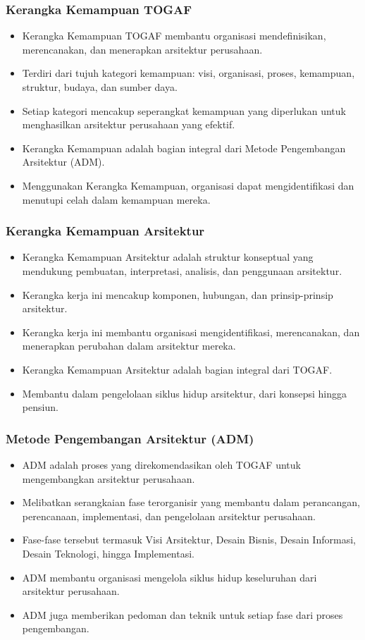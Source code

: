 \documentclass{beamer}
\begin{document}
	\begin{frame}
		\frametitle{Kerangka Kemampuan TOGAF}
		\begin{itemize}
			\item Kerangka Kemampuan TOGAF membantu organisasi mendefinisikan, merencanakan, dan menerapkan arsitektur perusahaan.
			\item Terdiri dari tujuh kategori kemampuan: visi, organisasi, proses, kemampuan, struktur, budaya, dan sumber daya.
			\item Setiap kategori mencakup seperangkat kemampuan yang diperlukan untuk menghasilkan arsitektur perusahaan yang efektif.
			\item Kerangka Kemampuan adalah bagian integral dari Metode Pengembangan Arsitektur (ADM).
			\item Menggunakan Kerangka Kemampuan, organisasi dapat mengidentifikasi dan menutupi celah dalam kemampuan mereka.
		\end{itemize}
	\end{frame}
	
	\begin{frame}
		\frametitle{Kerangka Kemampuan Arsitektur}
		\begin{itemize}
			\item Kerangka Kemampuan Arsitektur adalah struktur konseptual yang mendukung pembuatan, interpretasi, analisis, dan penggunaan arsitektur.
			\item Kerangka kerja ini mencakup komponen, hubungan, dan prinsip-prinsip arsitektur.
			\item Kerangka kerja ini membantu organisasi mengidentifikasi, merencanakan, dan menerapkan perubahan dalam arsitektur mereka.
			\item Kerangka Kemampuan Arsitektur adalah bagian integral dari TOGAF.
			\item Membantu dalam pengelolaan siklus hidup arsitektur, dari konsepsi hingga pensiun.
		\end{itemize}
	\end{frame}
	
	
	\begin{frame}
		\frametitle{Metode Pengembangan Arsitektur (ADM)}
		\begin{itemize}
			\item ADM adalah proses yang direkomendasikan oleh TOGAF untuk mengembangkan arsitektur perusahaan.
			\item Melibatkan serangkaian fase terorganisir yang membantu dalam perancangan, perencanaan, implementasi, dan pengelolaan arsitektur perusahaan.
			\item Fase-fase tersebut termasuk Visi Arsitektur, Desain Bisnis, Desain Informasi, Desain Teknologi, hingga Implementasi.
			\item ADM membantu organisasi mengelola siklus hidup keseluruhan dari arsitektur perusahaan.
			\item ADM juga memberikan pedoman dan teknik untuk setiap fase dari proses pengembangan.
		\end{itemize}
	\end{frame}
	
\end{document}
